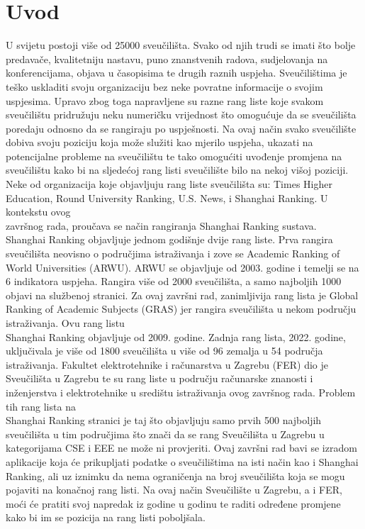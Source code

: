 \documentclass[times, utf8, zavrsni]{fer}
\begin{document}
\chapter{Uvod}
U svijetu postoji više od 25000 sveučilišta. Svako od njih trudi se imati što bolje predavače, kvalitetniju nastavu, puno znanstvenih radova, sudjelovanja na konferencijama,
objava u časopisima te drugih raznih uspjeha. Sveučilištima je teško uskladiti svoju organizaciju bez neke povratne informacije o svojim uspjesima. Upravo zbog toga napravljene su razne
rang liste koje svakom sveučilištu pridružuju neku numeričku vrijednost što omogućuje da se sveučilišta poredaju
odnosno da se rangiraju po uspješnosti. 
Na ovaj način svako sveučilište dobiva svoju poziciju 
koja može služiti kao mjerilo uspjeha, ukazati na potencijalne probleme na sveučilištu te tako omogućiti uvođenje promjena na sveučilištu kako bi 
na sljedećoj rang listi sveučilište bilo na nekoj višoj poziciji.\\ Neke od organizacija koje objavljuju rang liste sveučilišta su: Times Higher Education, Round University Ranking,
U.S. News, i Shanghai Ranking. U kontekstu ovog \\završnog rada, proučava se način rangiranja Shanghai Ranking sustava. \\ Shanghai Ranking objavljuje jednom godišnje dvije 
rang liste. Prva rangira sveučilišta neovisno o područjima istraživanja i zove se Academic Ranking of World Universities (ARWU). ARWU se objavljuje od 2003. godine i  
temelji se na 6 indikatora uspjeha. Rangira više od 2000 sveučilišta, a samo najboljih 1000 objavi na službenoj stranici. Za ovaj završni rad,
zanimljivija rang lista je Global Ranking of Academic Subjects
(GRAS) jer rangira sveučilišta u nekom području istraživanja. Ovu rang listu \\Shanghai Ranking objavljuje od 2009. godine. Zadnja rang lista, 2022. godine, uključivala je više od 1800 sveučilišta 
u više od 96 zemalja u 54 područja istraživanja. Fakultet elektrotehnike i računarstva u Zagrebu (FER) dio je Sveučilišta u Zagrebu te su rang liste u području 
računarske znanosti i inženjerstva  i elektrotehnike  u središtu istraživanja
ovog završnog rada. Problem tih rang lista 
na \\Shanghai Ranking stranici je taj što objavljuju samo prvih 500 najboljih sveučilišta u tim područjima što znači da se rang Sveučilišta u Zagrebu u kategorijama
CSE i EEE ne može ni provjeriti. 
Ovaj završni rad bavi se izradom aplikacije koja će prikupljati podatke o sveučilištima na isti način kao i Shanghai Ranking, ali uz iznimku da nema ograničenja na 
broj sveučilišta koja se mogu pojaviti na konačnoj rang listi. Na ovaj način Sveučilište u Zagrebu, a i FER, moći će pratiti svoj napredak iz godine u godinu te raditi određene 
promjene kako bi im se pozicija na rang listi poboljšala. 
\end{document}
